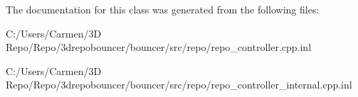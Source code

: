 The documentation for this class was generated from the following files\+:\begin{DoxyCompactItemize}
\item 
C\+:/\+Users/\+Carmen/3\+D Repo/\+Repo/3drepobouncer/bouncer/src/repo/repo\+\_\+controller.\+cpp.\+inl\item 
C\+:/\+Users/\+Carmen/3\+D Repo/\+Repo/3drepobouncer/bouncer/src/repo/repo\+\_\+controller\+\_\+internal.\+cpp.\+inl\end{DoxyCompactItemize}
